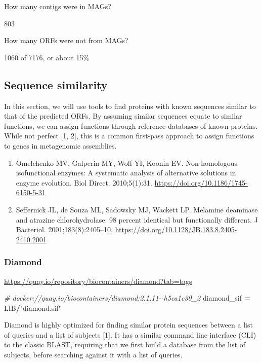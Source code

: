 \documentclass[
]{book}
\newenvironment{Shaded}{\begin{snugshade}}{\end{snugshade}}
\newcommand{\CommentTok}[1]{\textcolor[rgb]{0.56,0.35,0.01}{\textit{#1}}}
\newcommand{\NormalTok}[1]{#1}
\newcommand{\OperatorTok}[1]{\textcolor[rgb]{0.81,0.36,0.00}{\textbf{#1}}}
\newcommand{\StringTok}[1]{\textcolor[rgb]{0.31,0.60,0.02}{#1}}
\providecommand{\tightlist}{%
  \setlength{\itemsep}{0pt}\setlength{\parskip}{0pt}}
\begin{document}
How many contigs were in MAGs?

803

How many ORFs were not from MAGs?

1060 of 7176, or about 15\%

\subsection{Sequence similarity}\label{sequence-similarity}

In this section, we will use tools to find proteins with known sequences similar to that of the predicted ORFs.
By assuming similar sequences equate to similar functions, we can assign functions through reference databases of known proteins.
While not perfect {[}1, 2{]}, this is a common first-pass approach to assign functions to genes in metagenomic assemblies.

\begin{enumerate}
\def\labelenumi{\arabic{enumi}.}
\tightlist
\item
  Omelchenko MV, Galperin MY, Wolf YI, Koonin EV. Non-homologous isofunctional enzymes: A systematic analysis of alternative solutions in enzyme evolution. Biol Direct. 2010;5(1):31. \url{https://doi.org/10.1186/1745-6150-5-31}
\item
  Seffernick JL, de Souza ML, Sadowsky MJ, Wackett LP. Melamine deaminase and atrazine chlorohydrolase: 98 percent identical but functionally different. J Bacteriol. 2001;183(8):2405--10. \url{https://doi.org/10.1128/JB.183.8.2405-2410.2001}
\end{enumerate}

\subsubsection{Diamond}\label{diamond}

\url{https://quay.io/repository/biocontainers/diamond?tab=tags}

\begin{Shaded}
\begin{Highlighting}[numbers=left,,]
\CommentTok{\# docker://quay.io/biocontainers/diamond:2.1.11{-}{-}h5ca1c30\_2}
\NormalTok{diamond\_sif }\OperatorTok{=}\NormalTok{ LIB}\OperatorTok{/}\StringTok{"diamond.sif"}
\end{Highlighting}
\end{Shaded}

Diamond is highly optimized for finding similar protein sequences between a list of queries and a list of subjects {[}1{]}.
It has a similar command line interface (CLI) to the classic BLAST, requiring that we first build a database from the list of subjects,
before searching against it with a list of queries.
\end{document}
